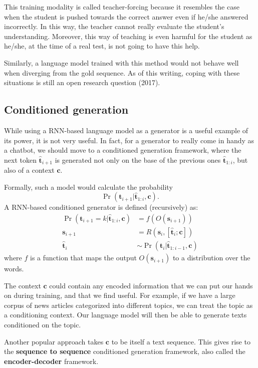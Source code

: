 This training modality is called teacher-forcing because it resembles the case when the student is pushed towards the correct answer even if he/she answered incorrectly. In this way, the teacher cannot really evaluate the student's understanding. Moreover, this way of teaching is even harmful for the student as he/she, at the time of a real test, is not going to have this help.

Similarly, a language model trained with this method would not behave well when diverging from the gold sequence. As of this writing, coping with these situations is still an open research question (2017).

\subsection{Conditioned generation}
While using a RNN-based language model as a generator is a useful example of its power, it is not very useful. In fact, for a generator to really come in handy as a chatbot, we should move to a conditioned generation framework, where the next token $\hat{\mathbf{t}}_{i+1}$ is generated not only on the base of the previous ones $\hat{\mathbf{t}}_{1:i}$, but also of a context $\mathbf{c}$.

Formally, such a model would calculate the probability
\[
\Pr(\mathbf{t}_{i+1}|\hat{\mathbf{t}}_{1:i}, \mathbf{c}).
\]
A RNN-based conditioned generator is defined (recursively) as:
\[
\begin{aligned}
\Pr(\mathbf{t}_{i+1}=k|\hat{\mathbf{t}}_{1:i}, \mathbf{c}) &= f(O(\mathbf{s}_{i+1})) \\
\mathbf{s}_{i+1}&=R(\mathbf{s}_{i}, [\mathbf{\hat{\mathbf{t}}}_{i};\mathbf{c}]) \\
\hat{\mathbf{t}}_{i} &\sim \Pr(\mathbf{t}_{i}|\hat{\mathbf{t}}_{1:i-1}, \mathbf{c})
\end{aligned}
\]
where $f$ is a function that maps the output $O(\mathbf{s}_{i+1})$ to a distribution over the words.

The context $\mathbf{c}$ could contain any encoded information that we can put our hands on during training, and that we find useful. For example, if we have a large corpus of news articles categorized into different topics, we can treat the topic as a conditioning context. Our language model will then be able to generate texts conditioned on the topic.

Another popular approach takes $\mathbf{c}$ to be itself a text sequence. This gives rise to the \textbf{sequence to sequence} conditioned generation framework, also called the \textbf{encoder-decoder} framework.

